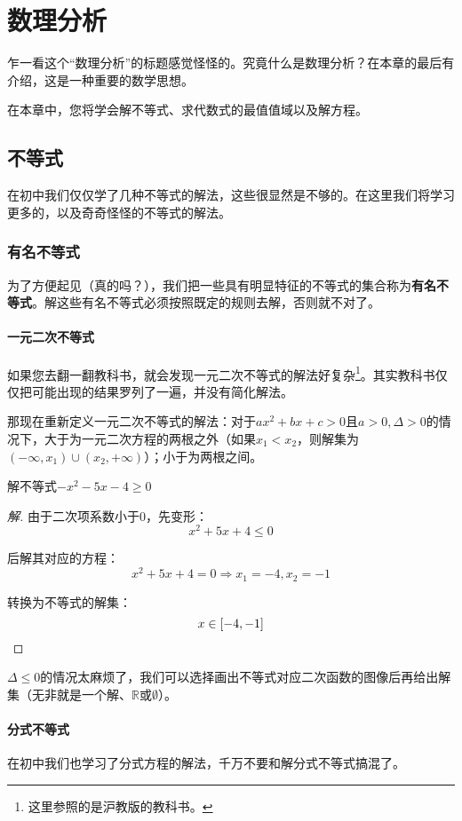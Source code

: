 \chapter{数理分析}
乍一看这个“数理分析”的标题感觉怪怪的。究竟什么是数理分析？在本章的最后有介绍，这是一种重要的数学思想。

在本章中，您将学会解不等式、求代数式的最值值域以及解方程。

\section{不等式}
在初中我们仅仅学了几种不等式的解法，这些很显然是不够的。在这里我们将学习更多的，以及奇奇怪怪的不等式的解法。

\subsection[有名]{有名不等式}
为了方便起见（真的吗？），我们把一些具有明显特征的不等式的集合称为\textbf{有名不等式}。解这些有名不等式必须按照既定的规则去解，否则就不对了。

\subsubsection{一元二次不等式}
如果您去翻一翻教科书，就会发现一元二次不等式的解法好复杂\footnote{这里参照的是沪教版的教科书。}。其实教科书仅仅把可能出现的结果罗列了一遍，并没有简化解法。

那现在重新定义一元二次不等式的解法：对于$ax^2+bx+c>0$且$a>0,\Delta>0$的情况下，大于为一元二次方程的两根之外（如果$x_1<x_2$，则解集为$(-\infty,x_1)\cup(x_2,+\infty)$）；小于为两根之间。

\begin{example}
	解不等式$-x^2-5x-4\geq0$
\end{example}
\begin{proof}[解]
	由于二次项系数小于$0$，先变形：\[x^2+5x+4\leq0\]

	后解其对应的方程：\[x^2+5x+4=0\Rightarrow x_1=-4,x_2=-1\]

	转换为不等式的解集：\[x\in[-4,-1]\qedhere\]
\end{proof}

$\Delta\leq0$的情况太麻烦了，我们可以选择画出不等式对应二次函数的图像后再给出解集（无非就是一个解、$\mathbb{R}$或$\emptyset$）。

\subsubsection{分式不等式}
在初中我们也学习了分式方程的解法，千万不要和解分式不等式搞混了。

